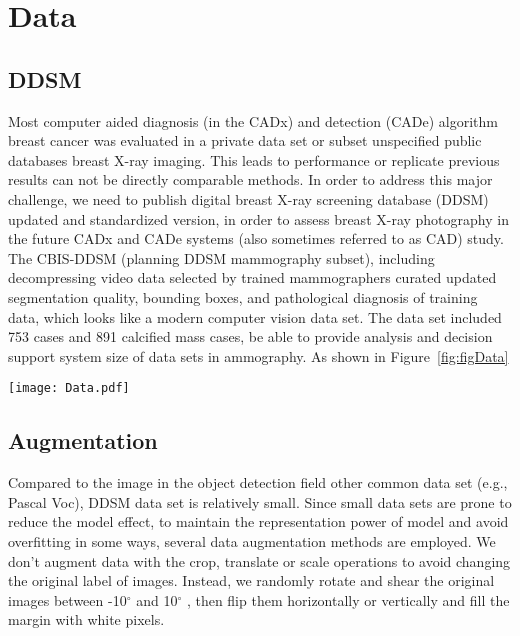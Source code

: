 \section{Data}
\label{sec:Data}

\subsection{DDSM}
\label{subsec: Date_DDSM}

Most computer aided diagnosis (in the CADx) 
and detection (CADe) algorithm breast cancer 
was evaluated in a private data set or 
subset unspecified public databases breast 
X-ray imaging.
\cite{Lee2017,Gao2019}
This leads to performance or replicate 
previous results can not be directly comparable 
methods.
\cite{Choukroun2017}
In order to address this major challenge, 
we need to publish digital breast X-ray 
screening database (DDSM) updated and 
standardized version, in order to assess 
breast X-ray photography in the future CADx 
and CADe systems (also sometimes referred to 
as CAD) study.
\cite{Zhu2017}
The CBIS-DDSM (planning DDSM mammography subset), 
including decompressing video data selected by 
trained mammographers curated updated 
segmentation quality, bounding boxes, and 
pathological diagnosis of training data, which 
looks like a modern computer vision data set.
The data set included 753 cases and 891 
calcified mass cases, be able to provide 
analysis and decision support system size of 
data sets in ammography.
As shown in Figure~\ref{fig:figData}

\begin{figure*}[!ht]
    \centering
    \texttt{[image: Data.pdf]}
    \caption{Examples in the dataset}
    \label{fig:figData}
\end{figure*}

\subsection{Augmentation}
\label{subsec: Date_Aug}

Compared to the image in the object detection 
field other common data set (e.g., Pascal Voc), 
DDSM data set is relatively small. 
\cite{M.HeathK.BowyerD.Kopans2001}
Since small data sets are prone to reduce the 
model effect, to maintain the representation 
power of model and avoid overfitting in some 
ways, several data augmentation methods are 
employed. 
We don’t augment data with the crop, translate 
or scale operations to avoid changing the 
original label of images.
Instead, we randomly rotate and shear the 
original images between -10$^{\circ}$ and 
10$^{\circ}$ , then flip them horizontally 
or vertically and fill the margin with 
white pixels. 